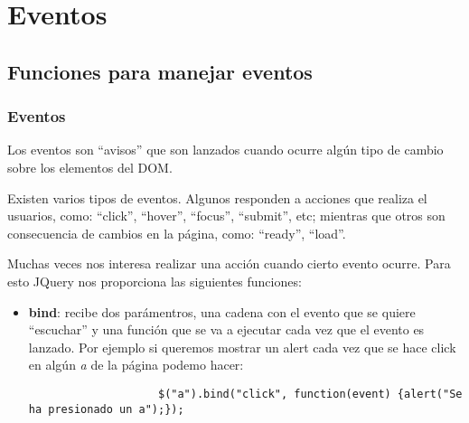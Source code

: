 \documentclass[10pt]{beamer}
\begin{document}
\section{Eventos}
\subsection{Funciones para manejar eventos}
\begin{frame}[fragile]
	\frametitle{Eventos}
	\pause Los eventos son ``avisos'' que son lanzados cuando ocurre algún tipo de cambio sobre los elementos del DOM.
	
	\pause Existen varios tipos de eventos. Algunos responden a acciones que realiza el usuarios,
			como: ``click'', ``hover'', ``focus'', ``submit'', etc; mientras que otros son consecuencia de cambios en
			la página, como: ``ready'', ``load''.
	
	\pause Muchas veces nos interesa realizar una acción cuando cierto evento ocurre. Para esto JQuery nos
			proporciona las siguientes funciones:
	
	\begin{itemize}
		\pause \item \textbf{bind}: recibe dos parámentros, una cadena con el evento que se quiere ``escuchar'' y una función
				que se va a ejecutar cada vez que el evento es lanzado. Por ejemplo si queremos mostrar un alert cada vez
				que se hace click en algún \emph{a} de la página podemo hacer:
				\begin{lstlisting}
					$("a").bind("click", function(event) {alert("Se ha presionado un a");});
				\end{lstlisting}
	\end{itemize}
\end{frame}
\end{document}
